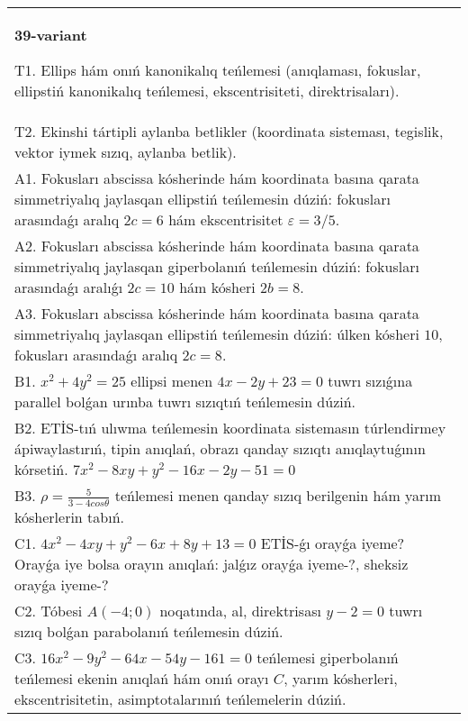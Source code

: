 \documentclass{article}
\begin{document}
\begin{tabular}{m{17cm}}
\textbf{39-variant}
\newline

T1. Ellips hám onıń kanonikalıq teńlemesi (anıqlaması, fokuslar, ellipstiń kanonikalıq teńlemesi, ekscentrisiteti, direktrisaları).\\

T2. Ekinshi tártipli aylanba betlikler (koordinata sisteması, tegislik, vektor iymek sızıq, aylanba betlik).\\

A1. Fokusları abscissa kósherinde hám koordinata basına qarata simmetriyalıq jaylasqan ellipstiń teńlemesin dúziń: fokusları arasındaǵı aralıq $2 c=6$ hám ekscentrisitet $\varepsilon=3/5$.\\

A2. Fokusları abscissa kósherinde hám koordinata basına qarata simmetriyalıq jaylasqan giperbolanıń teńlemesin dúziń: fokusları arasındaǵı aralıǵı $2 c=10$ hám kósheri $2 b=8$.\\

A3. Fokusları abscissa kósherinde hám koordinata basına qarata simmetriyalıq jaylasqan ellipstiń teńlemesin dúziń: úlken kósheri $10$, fokusları arasındaǵı aralıq $2 c=8$.\\

B1. $x^{2} + 4y^{2} = 25$ ellipsi menen $4x - 2y + 23 = 0$ tuwrı sızıǵına parallel bolǵan urınba tuwrı sızıqtıń teńlemesin dúziń.  \\

B2. ETİS-tıń ulıwma teńlemesin koordinata sistemasın túrlendirmey ápiwaylastırıń, tipin anıqlań, obrazı qanday sızıqtı anıqlaytuǵının kórsetiń. $7x^{2} - 8xy + y^{2} - 16x - 2y - 51 = 0$  \\

B3. $\rho = \frac{5}{3 - 4cos\theta}$ teńlemesi menen qanday sızıq berilgenin hám yarım kósherlerin tabıń.  \\

C1. $4x^{2} - 4xy + y^{2} - 6x + 8y + 13 = 0$ ETİS-ǵı orayǵa iyeme? Orayǵa iye bolsa orayın anıqlań: jalǵız orayǵa iyeme-?, sheksiz orayǵa iyeme-?  \\

C2. Tóbesi $A(-4;0)$ noqatında, al, direktrisası $y - 2 = 0$ tuwrı sızıq bolǵan parabolanıń teńlemesin dúziń.\\

C3. $16x^{2} - 9y^{2} - 64x - 54y - 161 = 0$ teńlemesi giperbolanıń teńlemesi ekenin anıqlań hám onıń orayı $C$, yarım kósherleri, ekscentrisitetin, asimptotalarınıń teńlemelerin dúziń.  \\

\end{tabular}
\vspace{1cm}
\end{document}
